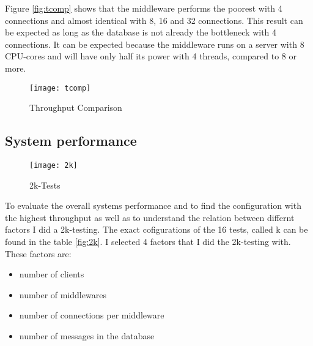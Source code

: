 \documentclass[
10pt, %
a4paper, %
oneside, %
headinclude,footinclude, %
BCOR5mm, %
]{scrartcl}
\begin{document}
Figure \vref{fig:tcomp} shows that the middleware performs the poorest with 4 connections and almost identical with 8, 16 and 32 connections. This result can be expected as long as the database is not already the bottleneck with 4 connections. It can be expected because the middleware runs on a server with 8 CPU-cores and will have only half its power with 4 threads, compared to 8 or more.
 

\begin{figure}[H]
\centering
\texttt{[image: tcomp]}
\caption{Throughput Comparison}
\label{fig:tcomp}
\end{figure}






\subsection{System performance}
\label{sec:2k}


\begin{sidewaysfigure}[h]
\centering
\texttt{[image: 2k]}
\caption{2k-Tests}
\label{fig:2k}
\end{sidewaysfigure}



To evaluate the overall systems performance and to find the configuration with the highest throughput as well as to understand the relation between differnt factors I did a 2k-testing. The exact cofigurations of the 16 tests, called k\* can be found in the table \vref{fig:2k}. I selected 4 factors that I did the 2k-testing with. These factors are:
\begin{itemize}
\item number of clients
\item number of middlewares
\item number of connections per middleware
\item number of messages in the database
\end{itemize}
\end{document}
